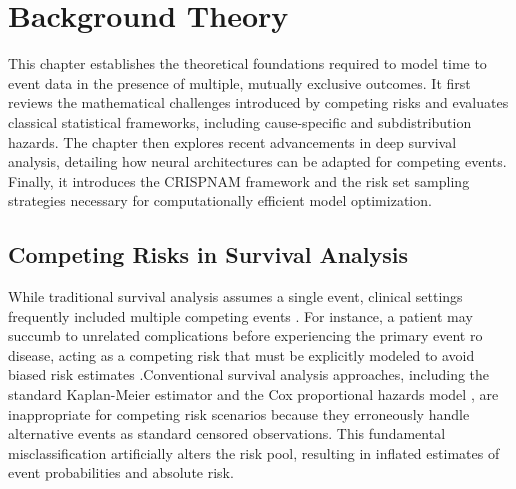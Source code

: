 \documentclass[a4paper,twoside,12pt]{report}
\begin{document}
\chapter{Background Theory}
\label{ch:background_theory}

This chapter establishes the theoretical foundations required to model time to event data in the presence of multiple, mutually exclusive outcomes. It first reviews the mathematical challenges introduced by competing risks and evaluates classical statistical frameworks, including cause-specific and subdistribution hazards. The chapter then explores recent advancements in deep survival analysis, detailing how neural architectures can be adapted for competing events. Finally, it introduces the CRISPNAM framework and the risk set sampling strategies necessary for computationally efficient model optimization.

\section{Competing Risks in Survival Analysis}
While traditional survival analysis assumes a single event, clinical settings frequently included multiple competing events \citep{latouche2013competing}. For instance, a patient may succumb to unrelated complications before experiencing the primary event ro disease, acting as a competing risk that must be explicitly modeled to avoid biased risk estimates \citep{andersen2012competing, prentice1978analysis}.Conventional survival analysis approaches, including the standard Kaplan-Meier estimator and the Cox proportional hazards model \citep{Cox1972}, are inappropriate for competing risk scenarios because they erroneously handle alternative events as standard censored observations. This fundamental misclassification artificially alters the risk pool, resulting in inflated estimates of event probabilities and absolute risk. 
\end{document}

